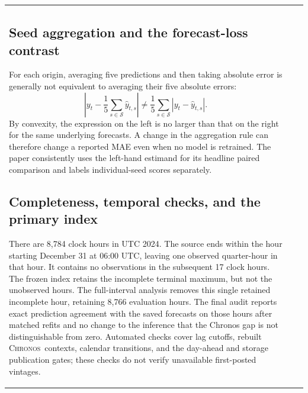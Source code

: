 \documentclass[11pt,letterpaper]{article}
\newcommand{\Chronos}{\textsc{Chronos}}
\begin{document}
\begin{table}[t]
\begin{tabularx}{\linewidth}{@{}>{\raggedright\arraybackslash}p{2.45cm}>{\raggedright\arraybackslash}X>{\raggedright\arraybackslash}p{2.45cm}@{}}
\subsection{Seed aggregation and the forecast-loss contrast}
For each origin, averaging five predictions and then taking absolute error is generally not equivalent to averaging their five absolute errors:
\begin{equation}
\left|y_t-\frac15\sum_{s\in\mathcal S}\hat y_{t,s}\right|
\ne \frac15\sum_{s\in\mathcal S}|y_t-\hat y_{t,s}|.
\end{equation}
By convexity, the expression on the left is no larger than that on the right for the same underlying forecasts. A change in the aggregation rule can therefore change a reported MAE even when no model is retrained. The paper consistently uses the left-hand estimand for its headline paired comparison and labels individual-seed scores separately.

\subsection{Completeness, temporal checks, and the primary index}
There are 8,784 clock hours in UTC 2024. The source ends within the hour starting December 31 at 06:00 UTC, leaving one observed quarter-hour in that hour. It contains no observations in the subsequent 17 clock hours. The frozen index retains the incomplete terminal maximum, but not the unobserved hours. The full-interval analysis removes this single retained incomplete hour, retaining 8,766 evaluation hours. The final audit reports exact prediction agreement with the saved forecasts on those hours after matched refits and no change to the inference that the Chronos gap is not distinguishable from zero. Automated checks cover lag cutoffs, rebuilt \Chronos\ contexts, calendar transitions, and the day-ahead and storage publication gates; these checks do not verify unavailable first-posted vintages.


\end{tabularx}
\end{table}
\end{document}
